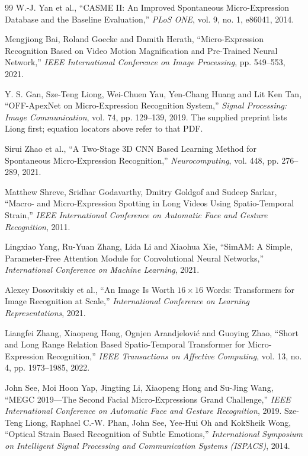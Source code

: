\documentclass[11pt,a4paper]{article}
\numberwithin{equation}{section}
\begin{document}
\begin{thebibliography}{99}
W.-J. Yan et al., ``CASME II: An Improved Spontaneous Micro-Expression Database
and the Baseline Evaluation,'' \emph{PLoS ONE}, vol. 9, no. 1, e86041, 2014.

Mengjiong Bai, Roland Goecke and Damith Herath, ``Micro-Expression Recognition
Based on Video Motion Magnification and Pre-Trained Neural Network,''
\emph{IEEE International Conference on Image Processing}, pp. 549--553, 2021.

Y. S. Gan, Sze-Teng Liong, Wei-Chuen Yau, Yen-Chang Huang and Lit Ken Tan,
``OFF-ApexNet on Micro-Expression Recognition System,''
\emph{Signal Processing: Image Communication}, vol. 74, pp. 129--139, 2019.
The supplied preprint lists Liong first; equation locators above refer to that PDF.

Sirui Zhao et al., ``A Two-Stage 3D CNN Based Learning Method for Spontaneous
Micro-Expression Recognition,'' \emph{Neurocomputing}, vol. 448,
pp. 276--289, 2021.

Matthew Shreve, Sridhar Godavarthy, Dmitry Goldgof and Sudeep Sarkar,
``Macro- and Micro-Expression Spotting in Long Videos Using Spatio-Temporal
Strain,'' \emph{IEEE International Conference on Automatic Face and Gesture
Recognition}, 2011.

Lingxiao Yang, Ru-Yuan Zhang, Lida Li and Xiaohua Xie,
``SimAM: A Simple, Parameter-Free Attention Module for Convolutional Neural
Networks,'' \emph{International Conference on Machine Learning}, 2021.

Alexey Dosovitskiy et al., ``An Image Is Worth $16\times16$ Words:
Transformers for Image Recognition at Scale,''
\emph{International Conference on Learning Representations}, 2021.

Liangfei Zhang, Xiaopeng Hong, Ognjen Arandjelovi{\'c} and Guoying Zhao,
``Short and Long Range Relation Based Spatio-Temporal Transformer for
Micro-Expression Recognition,'' \emph{IEEE Transactions on Affective
Computing}, vol. 13, no. 4, pp. 1973--1985, 2022.

John See, Moi Hoon Yap, Jingting Li, Xiaopeng Hong and Su-Jing Wang,
``MEGC 2019---The Second Facial Micro-Expressions Grand Challenge,''
\emph{IEEE International Conference on Automatic Face and Gesture
Recognition}, 2019.
Sze-Teng Liong, Raphael C.-W. Phan, John See, Yee-Hui Oh and KokSheik Wong,
``Optical Strain Based Recognition of Subtle Emotions,'' \emph{International
Symposium on Intelligent Signal Processing and Communication Systems
(ISPACS)}, 2014.


\end{thebibliography}
\end{document}
